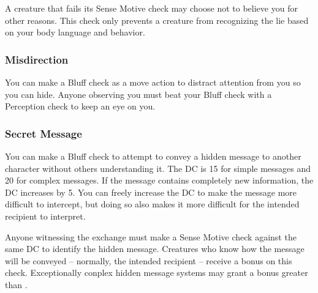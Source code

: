 A creature that fails its Sense Motive check may choose not to believe you for other reasons. This check only prevents a creature from recognizing the lie based on your body language and behavior.

\subsubsection{Misdirection}
You can make a Bluff check as a move action to distract attention from you so you can hide. Anyone observing you must beat your Bluff check with a Perception check to keep an eye on you.

\subsubsection{Secret Message}
You can make a Bluff check to attempt to convey a hidden message to another character without others understanding it. The DC is 15 for simple messages and 20 for complex messages. If the message contains completely new information, the DC increases by 5. You can freely increase the DC to make the message more difficult to intercept, but doing so also makes it more difficult for the intended recipient to interpret.

Anyone witnessing the exchange must make a Sense Motive check against the same DC to identify the hidden message. Creatures who know how the message will be conveyed -- normally, the intended recipient -- receive a  bonus on this check. Exceptionally conplex hidden message systems may grant a bonus greater than .

